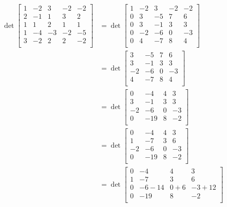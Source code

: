 \documentclass{article}
\newcommand*{\m}[1]{\begin{bmatrix}#1\end{bmatrix}}
\begin{document}
\[\begin{aligned}
    \det\m{
        1 & -2 &  3 & -2 & -2 \\
        2 & -1 &  1 &  3 &  2 \\
        1 &  1 &  2 &  1 &  1 \\
        1 & -4 & -3 & -2 & -5 \\
        3 & -2 &  2 &  2 & -2 \\
    }&=\det\m{
        1 & -2 &  3 & -2 & -2 \\
        0 &  3 & -5 &  7 &  6 \\
        0 &  3 & -1 &  3 &  3 \\
        0 & -2 & -6 &  0 & -3 \\
        0 &  4 & -7 &  8 &  4 \\
    }\\&=\det\m{
        3 & -5 &  7 &  6 \\
         3 & -1 &  3 &  3 \\
        -2 & -6 &  0 & -3 \\
         4 & -7 &  8 &  4 \\
    }\\&=\det\m{
         0 & -4 &  4 &  3 \\
         3 & -1 &  3 &  3 \\
        -2 & -6 &  0 & -3 \\
         0 & -19 & 8 & -2 \\
    }\\&=\det\m{
        0 & -4 &  4 &  3 \\
        1 & -7 &  3 &  6 \\
       -2 & -6 &  0 & -3 \\
        0 & -19 & 8 & -2 \\
    }\\&=\det\m{
        0 & -4 &  4 &  3 \\
        1 & -7 &  3 &  6 \\
        0 & -6-14 &  0+6 & -3+12 \\
        0 & -19 & 8 & -2 \\
    }
\end{aligned}\]
\end{document}

